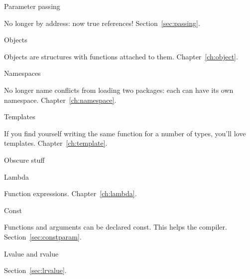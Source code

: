  {Parameter passing}

No longer by address: now true references! Section~\ref{sec:passing}.

 {Objects}

Objects are structures with functions attached to
them. Chapter~\ref{ch:object}.

 {Namespaces}

No longer name conflicts from loading two packages: each can have its
own namespace. Chapter~\ref{ch:namespace}.

 {Templates}

If you find yourself writing the same function for a number of types,
you'll love templates. Chapter~\ref{ch:template}.

 {Obscure stuff}

 {Lambda}

Function expressions.
Chapter~\ref{ch:lambda}.

 {Const}

Functions and arguments can be declared const. This helps the
compiler. Section~\ref{sec:constparam}.

 {Lvalue and rvalue}

Section~\ref{sec:lrvalue}.

\endinput

You’ll have no destructors, so cleanup is manual. This is most fun
with early-return functions, but it can keep you entertained for all
cases. File handles, memory, and other resources (thread locks,
anyone) are all waiting patiently and silently for you to forget them.

Initialization has be be explicitly called. No constructors either.

Want inheritance? Sure. Write your own vtable (often done with function pointers in a struct).
Instead of templates, you’ll need to abandon type safety and cast back and forth to (void*). Don’t explicitly cast to (void *), because the compiler never warns about explicit or implicit casts to and from (void *).

You’ll also need to make sure you’re using the right library calls - snprintf versus sprintf etc. Hopefully an existing project will be using the right ones.

On the plus side, you’re moving to Linux, and a lot of the tooling available is - while very command-line oriented - very good indeed.

For an IDE, I’d recommend CLion from JetBrains, but I’m told that with sufficient patience, Atom can be encouraged into doing useful stuff.

You’ll find that while the command-line of GDB, the debugger, isn’t very easy to learn to begin with, it’s very powerful, allowing you to do conditional breakpoints with comparative ease.

Valgrind is amazing. Voodoo. It’ll find uninitialized memory, allocation errors, overflows, and leaks - all common and hard to debug issues in C.

The CLang static analyzer is pretty impressive, too.

(copied from
\url{https://www.quora.com/How-should-a-C++-programmer-learn-Linux-C/answer/Dave-Cridland})
